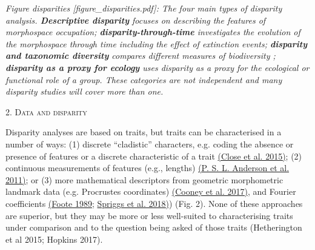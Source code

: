 \documentclass[12pt,letterpaper]{article}
\renewcommand{\section}[1]{%
\bigskip
\begin{center}
\begin{Large}
\normalfont\scshape #1
\medskip
\end{Large}
\end{center}}
\begin{document}

\emph{Figure disparities {[}figure\_disparities.pdf{]}: The four main types of disparity analysis. \textbf{Descriptive disparity} focuses on describing the features of morphospace occupation; \textbf{disparity-through-time} investigates the evolution of the morphospace through time including the effect of extinction events; \textbf{disparity and taxonomic diversity} compares different measures of biodiversity ; \textbf{disparity as a proxy for ecology} uses disparity as a proxy for the ecological or functional role of a group.
These categories are not independent and many disparity studies will cover more than one.}



\hypertarget{data-and-disparity}{%
\section{2. Data and disparity }\label{data-and-disparity}}

Disparity analyses are based on traits, but traits can be characterised in a number of ways:
(1) discrete ``cladistic'' characters, e.g. coding the absence or presence of features or a discrete characteristic of a trait \href{https://paperpile.com/c/sTGYvp/PbSx}{(Close et al. 2015)};
(2) continuous measurements of features (e.g., lengths) \href{https://paperpile.com/c/sTGYvp/qjj9}{(P. S. L. Anderson et al. 2011)}; or
(3) more mathematical descriptors from geometric morphometric landmark data (e.g. Procrustes coordinates) \href{https://paperpile.com/c/sTGYvp/RjqE}{(Cooney et al. 2017)}, and Fourier coefficients \href{https://paperpile.com/c/sTGYvp/2Neu}{(Foote 1989;} \href{https://paperpile.com/c/sTGYvp/ZEDR}{Spriggs et al. 2018)}) (Fig. 2).
None of these approaches are superior, but they may be more or less well-suited to characterising traits under comparison and to the question being asked of those traits (Hetherington et al 2015; Hopkins 2017).
\end{document}
